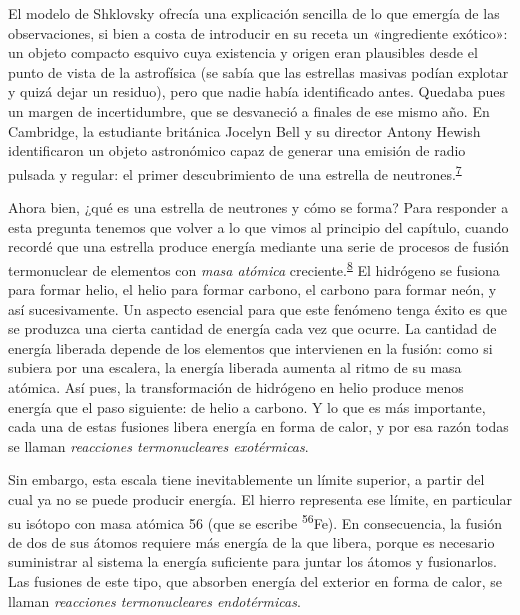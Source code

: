 El modelo de Shklovsky ofrecía una explicación sencilla de lo que emergía de las observaciones, si bien a costa de introducir en su receta un «ingrediente exótico»: un objeto compacto esquivo cuya existencia y origen eran plausibles desde el punto de vista de la astrofísica (se sabía que las estrellas masivas podían explotar y quizá dejar un residuo), pero que nadie había identificado antes. Quedaba pues un margen de incertidumbre, que se desvaneció a finales de ese mismo año. En Cambridge, la estudiante británica Jocelyn Bell y su director Antony Hewish identificaron un objeto astronómico capaz de generar una emisión de radio pulsada y regular: el primer descubrimiento de una estrella de neutrones.\textsuperscript{\hyperlink{note:05-07}{7}}

Ahora bien, ¿qué es una estrella de neutrones y cómo se forma? Para responder a esta pregunta tenemos que volver a lo que vimos al principio del capítulo, cuando recordé que una estrella produce energía mediante una serie de procesos de fusión termonuclear de elementos con \emph{masa atómica} creciente.\textsuperscript{\hyperlink{note:05-08}{8}} El hidrógeno se fusiona para formar helio, el helio para formar carbono, el carbono para formar neón, y así sucesivamente. Un aspecto esencial para que este fenómeno tenga éxito es que se produzca una cierta cantidad de energía cada vez que ocurre. La cantidad de energía liberada depende de los elementos que intervienen en la fusión: como si subiera por una escalera, la energía liberada aumenta al ritmo de su masa atómica. Así pues, la transformación de hidrógeno en helio produce menos energía que el paso siguiente: de helio a carbono. Y lo que es más importante, cada una de estas fusiones libera energía en forma de calor, y por esa razón todas se llaman \emph{reacciones termonucleares exotérmicas}.

Sin embargo, esta escala tiene inevitablemente un límite superior, a partir del cual ya no se puede producir energía. El hierro representa ese límite, en particular su isótopo con masa atómica 56 (que se escribe \textsuperscript{56}Fe). En consecuencia, la fusión de dos de sus átomos requiere más energía de la que libera, porque es necesario suministrar al sistema la energía suficiente para juntar los átomos y fusionarlos. Las fusiones de este tipo, que absorben energía del exterior en forma de calor, se llaman \emph{reacciones termonucleares endotérmicas}.

